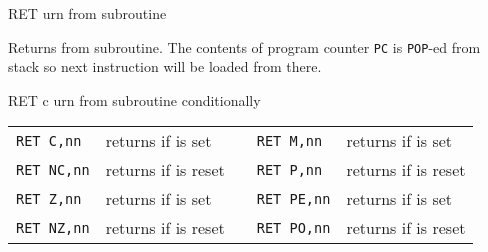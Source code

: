\begin{basedescript}{
	\desclabelstyle{\multilinelabel}
	\desclabelwidth{3cm}}
	\pagebreak


	\begin{DetailItem}{RET}{}
		{urn from subroutine}
		{\SymRET}

		Returns from subroutine. The contents of program counter {\tt PC} is {\tt POP}-ed from stack so next instruction will be loaded from there.

		\begin{DetailEffects}
			\FlagsRET
		\end{DetailEffects}
				
		\begin{DetailTiming}
		\end{DetailTiming}

	\end{DetailItem}


	\begin{DetailItem}{RET c}{}
		{urn from subroutine conditionally}
		{}

		\vspace{1ex} %
		\begin{tabular}{@{}llcll}
			{\tt RET C,nn} & returns if \FlagCF{} is set & & 
				{\tt RET M,nn} & returns if \FlagSF{} is set\\
			{\tt RET NC,nn} & returns if \FlagCF{} is reset & & 
				{\tt RET P,nn} & returns if \FlagSF{} is reset\\
			{\tt RET Z,nn} & returns if \FlagZF{} is set & & 
				{\tt RET PE,nn} & returns if \FlagPV{} is set\\
			{\tt RET NZ,nn} & returns if \FlagZF{} is reset & & 
				{\tt RET PO,nn} & returns if \FlagPV{} is reset\\
		\end{tabular}


\end{DetailItem}
\end{basedescript}
